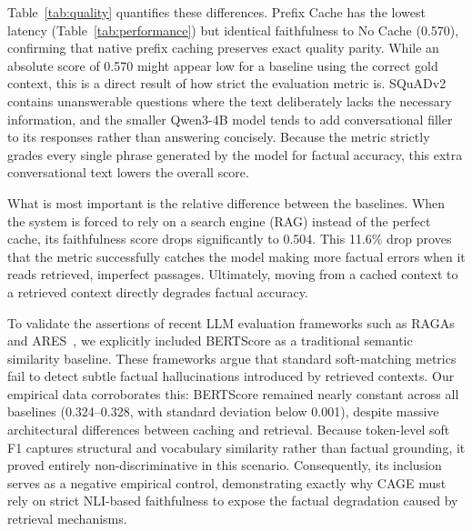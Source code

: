 \documentclass[12pt,a4paper]{article}
\let\cite\citep
\begin{document}
Table~\ref{tab:quality} quantifies these differences. Prefix Cache has the lowest latency (Table~\ref{tab:performance}) but identical faithfulness to No Cache (0.570), confirming that native prefix caching preserves exact quality parity. While an absolute score of 0.570 might appear low for a baseline using the correct gold context, this is a direct result of how strict the evaluation metric is. SQuADv2 contains unanswerable questions where the text deliberately lacks the necessary information, and the smaller Qwen3-4B model tends to add conversational filler to its responses rather than answering concisely. Because the metric strictly grades every single phrase generated by the model for factual accuracy, this extra conversational text lowers the overall score.

What is most important is the relative difference between the baselines. When the system is forced to rely on a search engine (RAG) instead of the perfect cache, its faithfulness score drops significantly to 0.504. This 11.6\% drop proves that the metric successfully catches the model making more factual errors when it reads retrieved, imperfect passages. Ultimately, moving from a cached context to a retrieved context directly degrades factual accuracy.

To validate the assertions of recent LLM evaluation frameworks such as RAGAs~\cite{espejel2023ragas} and ARES~\cite{ares2024}, we explicitly included BERTScore as a traditional semantic similarity baseline. These frameworks argue that standard soft-matching metrics fail to detect subtle factual hallucinations introduced by retrieved contexts. Our empirical data corroborates this: BERTScore remained nearly constant across all baselines (0.324--0.328, with standard deviation below 0.001), despite massive architectural differences between caching and retrieval. Because token-level soft F1 captures structural and vocabulary similarity rather than factual grounding, it proved entirely non-discriminative in this scenario. Consequently, its inclusion serves as a negative empirical control, demonstrating exactly why CAGE must rely on strict NLI-based faithfulness to expose the factual degradation caused by retrieval mechanisms.
\end{document}
